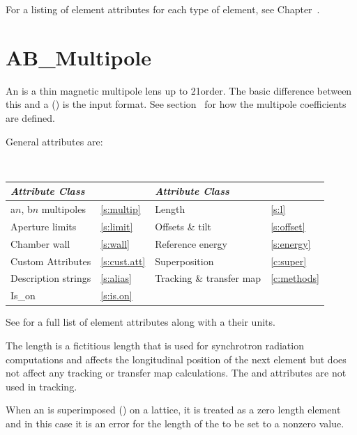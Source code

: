 For a listing of element attributes for each type of element, see Chapter~.

\newpage

\section{AB_Multipole}
\label{s:ab.m}

An  is a thin magnetic multipole lens up to 21\St order. The basic difference
between this and a  () is the input format. See
section~ for how the multipole coefficients are defined.

General  attributes are:
\begin{center}
\tt
\begin{tabular}{llll} \toprule
  {\sl Attribute Class}      & \s               & {\sl Attribute Class}      & \s              \\ \midrule
  a$n$, b$n$ multipoles      & \ref{s:multip}   & Length                     & \ref{s:l}       \\
  Aperture limits            & \ref{s:limit}    & Offsets \& tilt            & \ref{s:offset}  \\
  Chamber wall               & \ref{s:wall}     & Reference energy           & \ref{s:energy}  \\ 
  Custom Attributes          & \ref{s:cust.att} & Superposition              & \ref{c:super}   \\
  Description strings        & \ref{s:alias}    & Tracking \& transfer map   & \ref{c:methods} \\
  Is_on                      & \ref{s:is.on}    &                            &                 \\
  \bottomrule
\end{tabular}
\end{center}
\toffset
See  for a full list of element attributes along with a their units.

The length  is a fictitious length that is used for synchrotron radiation computations and
affects the longitudinal position of the next element but does not affect any tracking or transfer
map calculations.  The  and  attributes are not used in tracking.

When an  is superimposed () on a lattice, it is treated as a zero
length element and in this case it is an error for the length of the  to be set to
a nonzero value.

